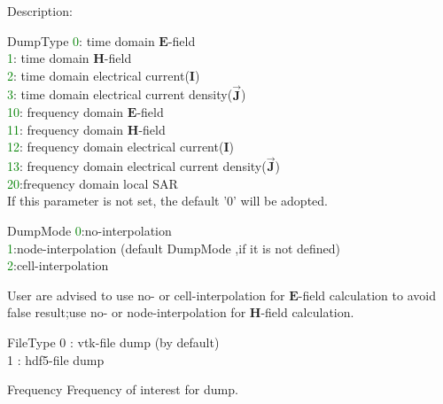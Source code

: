 \begin{FontDescr}{Description:}

\begin{FontPara}{DumpType}
\textcolor{green}{0}: time domain $\mathbf{E}$-field \\
\textcolor{green}{1}: time domain $\mathbf{H}$-field \\
\textcolor{green}{2}: time domain electrical current($\mathbf{I}$)  \\
\textcolor{green}{3}: time domain electrical current density($\vec{\mathbf{J}}$)\\

\textcolor{green}{10}: frequency domain $\mathbf{E}$-field  \\
\textcolor{green}{11}: frequency domain $\mathbf{H}$-field\\
\textcolor{green}{12}: frequency domain electrical current($\mathbf{I}$)\\
\textcolor{green}{13}: frequency domain electrical current density($\vec{\mathbf{J}}$)\\

\textcolor{green}{20}:frequency domain local SAR \\

If this parameter is not set, the default '0' will be adopted. 
\end{FontPara}


\begin{FontPara}{DumpMode}
\textcolor{green}{0}:no-interpolation \\
\textcolor{green}{1}:node-interpolation (default DumpMode ,if it is not defined)\\
\textcolor{green}{2}:cell-interpolation

User are advised to use no- or cell-interpolation for $\mathbf{E}$-field calculation to avoid false result;use no- or node-interpolation for $\mathbf{H}$-field calculation.

\end{FontPara}

\begin{FontPara}{FileType}
  0 : vtk-file dump  (by default)\\
  1 : hdf5-file dump
\end{FontPara}

\begin{FontPara}{Frequency}
Frequency of interest for dump. 
\end{FontPara}

\end{FontDescr}

